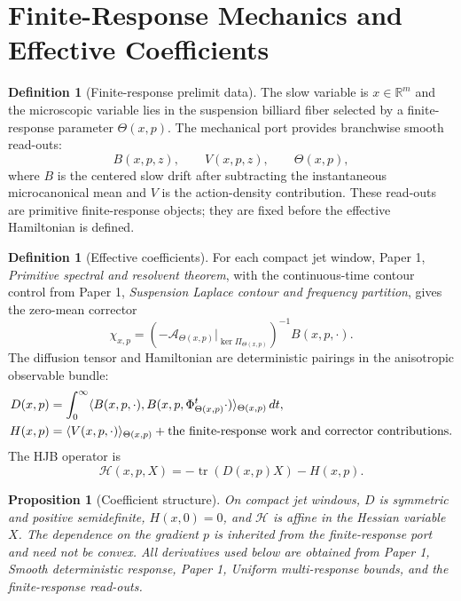 \documentclass[11pt]{amsart}
\newtheorem{proposition}[theorem]{Proposition}
\theoremstyle{definition}
\newtheorem{definition}[theorem]{Definition}
\theoremstyle{remark}
\newcommand{\R}{\mathbb R}
\newcommand{\Hcal}{\mathcal H}
\newcommand{\Acal}{\mathcal A}
\newcommand{\PaperOne}[2]{Paper 1, \emph{#1}}
\begin{document}
\section{Finite-Response Mechanics and Effective Coefficients}

\begin{definition}[Finite-response prelimit data]
\label{def:finite_response_prelimit_data}
The slow variable is $x\in\R^m$ and the microscopic variable lies in the
suspension billiard fiber selected by a finite-response parameter
$\Theta(x,p)$.  The mechanical port provides branchwise smooth read-outs:
\begin{equation}
  B(x,p,z),\qquad V(x,p,z),\qquad \Theta(x,p),
\end{equation}
where $B$ is the centered slow drift after subtracting the instantaneous
microcanonical mean and $V$ is the action-density contribution.  These read-outs
are primitive finite-response objects; they are fixed before the effective
Hamiltonian is defined.
\end{definition}

\begin{definition}[Effective coefficients]
\label{def:effective_coefficients}
For each compact jet window, \PaperOne{Primitive spectral and resolvent
theorem}{thm:primitive_spectral_resolvent}, with the continuous-time contour
control from
\PaperOne{Suspension Laplace contour and frequency partition}{lem:suspension_laplace_contour},
gives the zero-mean corrector
\begin{equation}
  \chi_{x,p}=(-\Acal_{\Theta(x,p)}|_{\ker\Pi_{\Theta(x,p)}})^{-1}B(x,p,\cdot).
\end{equation}
The diffusion tensor and Hamiltonian are deterministic pairings in the
anisotropic observable bundle:
\begin{align}
  D(x,p)&=\int_0^\infty
  \langle B(x,p,\cdot),B(x,p,\Phi_{\Theta(x,p)}^t\cdot)\rangle_{\Theta(x,p)}
  \,dt,\\
  H(x,p)&=\langle V(x,p,\cdot)\rangle_{\Theta(x,p)}
  +\hbox{the finite-response work and corrector contributions}.
\end{align}
The HJB operator is
\begin{equation}
  \Hcal(x,p,X)=-\operatorname{tr}(D(x,p)X)-H(x,p).
\end{equation}
\end{definition}

\begin{proposition}[Coefficient structure]
\label{prop:coefficient_structure}
On compact jet windows, $D$ is symmetric and positive semidefinite, $H(x,0)=0$,
and $\Hcal$ is affine in the Hessian variable $X$.  The dependence on the
gradient $p$ is inherited from the finite-response port and need not be convex.
All derivatives used below are obtained from
\PaperOne{Smooth deterministic response}{thm:smooth_deterministic_response},
\PaperOne{Uniform multi-response bounds}{prop:uniform_multiresponse_bounds},
and the finite-response read-outs.
\end{proposition}
\end{document}
